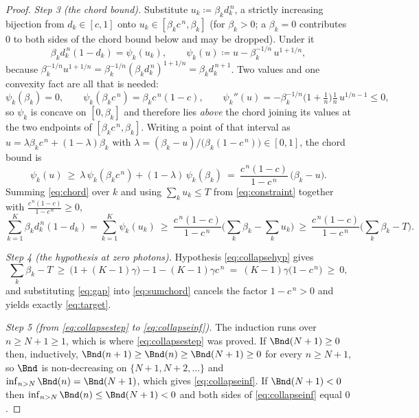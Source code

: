 \begin{proof}
\emph{Step 3 (the chord bound).} Substitute $u_k\coloneqq\beta_kd_k^{\,n}$, a strictly increasing bijection from
$d_k\in[c,1]$ onto $u_k\in[\beta_kc^{\,n},\beta_k]$ (for $\beta_k>0$; a
$\beta_k=0$ contributes $0$ to both sides of the chord bound below and may be
dropped). Under it
\begin{equation}\label{eq:psi}
  \beta_kd_k^{\,n}(1-d_k)=\psi_k(u_k),\qquad
  \psi_k(u)\coloneqq u-\beta_k^{-1/n}\,u^{1+1/n},
\end{equation}
because $\beta_k^{-1/n}u^{1+1/n}=\beta_k^{-1/n}
(\beta_kd_k^{\,n})^{1+1/n}=\beta_kd_k^{\,n+1}$. Two values and one convexity
fact are all that is needed:
\begin{equation}\label{eq:psivalues}
  \psi_k(\beta_k)=0,\qquad
  \psi_k(\beta_kc^{\,n})=\beta_kc^{\,n}(1-c),\qquad
  \psi_k''(u)=-\beta_k^{-1/n}\Big(1+\tfrac1n\Big)\tfrac1n\,u^{1/n-1}\le0 ,
\end{equation}
so $\psi_k$ is concave on $[0,\beta_k]$ and therefore lies \emph{above} the
chord joining its values at the two endpoints of
$[\beta_kc^{\,n},\beta_k]$. Writing a point of that interval as
$u=\lambda\beta_kc^{\,n}+(1-\lambda)\beta_k$ with
$\lambda=(\beta_k-u)/\big(\beta_k(1-c^{\,n})\big)\in[0,1]$, the chord bound is
\begin{equation}\label{eq:chord}
  \psi_k(u)\ \ge\ \lambda\,\psi_k(\beta_kc^{\,n})+(1-\lambda)\,\psi_k(\beta_k)
  \ =\ \frac{c^{\,n}(1-c)}{1-c^{\,n}}\,\big(\beta_k-u\big).
\end{equation}
Summing \eqref{eq:chord} over $k$ and using $\sum_ku_k\le T$ from
\eqref{eq:constraint} together with $\frac{c^{\,n}(1-c)}{1-c^{\,n}}\ge0$,
\begin{equation}\label{eq:sumchord}
  \sum_{k=1}^{K}\beta_kd_k^{\,n}(1-d_k)
  =\sum_{k=1}^{K}\psi_k(u_k)
  \ \ge\ \frac{c^{\,n}(1-c)}{1-c^{\,n}}
    \Big(\sum_{k}\beta_k-\sum_ku_k\Big)
  \ \ge\ \frac{c^{\,n}(1-c)}{1-c^{\,n}}
    \Big(\sum_{k}\beta_k-T\Big).
\end{equation}

\emph{Step 4 (the hypothesis at zero photons).} Hypothesis
\eqref{eq:collapsehyp} gives
\begin{equation}\label{eq:gap}
  \sum_k\beta_k-T\ \ge\ \big(1+(K-1)\gamma\big)-1-(K-1)\gamma c^{\,n}
  \ =\ (K-1)\gamma\big(1-c^{\,n}\big)\ \ge\ 0 ,
\end{equation}
and substituting \eqref{eq:gap} into \eqref{eq:sumchord} cancels the factor
$1-c^{\,n}>0$ and yields exactly \eqref{eq:target}.

\emph{Step 5 (from \eqref{eq:collapsestep} to \eqref{eq:collapseinf}).} The induction
runs over $n\ge N+1\ge1$, which is where \eqref{eq:collapsestep} was proved. If
$\Bnd(N+1)\ge0$ then, inductively, $\Bnd(n+1)\ge\Bnd(n)\ge\Bnd(N+1)\ge0$ for
every $n\ge N+1$, so $\Bnd$ is non-decreasing on $\{N+1,N+2,\dots\}$ and
$\inf_{n>N}\Bnd(n)=\Bnd(N+1)$, which gives \eqref{eq:collapseinf}. If
$\Bnd(N+1)<0$ then $\inf_{n>N}\Bnd(n)\le\Bnd(N+1)<0$ and both sides of
\eqref{eq:collapseinf} equal $0$.
\end{proof}
